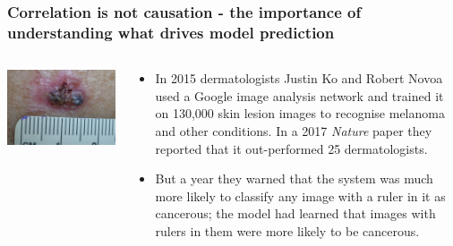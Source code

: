 \begin{frame}
\frametitle{Correlation is not causation - the importance of understanding what drives model prediction}
\begin{columns}
    \begin{column}{0.3\textwidth}
        \includegraphics[width=1\textwidth]{./misc_images/skin_cancer.png}
    \end{column}
    \begin{column}{0.67\textwidth}
    \begin{itemize}
    \item In 2015 dermatologists Justin Ko and Robert Novoa used a Google image analysis network and trained it on 130,000 skin lesion images to recognise melanoma and other conditions. In a 2017 \emph{Nature} paper they reported that it out-performed 25 dermatologists.
        
    \item But a year they warned that the system was much more likely to classify any image with a ruler in it as cancerous; the model had learned that images with rulers in them were more likely to be cancerous.
    \end{itemize}
    \end{column}
\end{columns}
\end{frame}